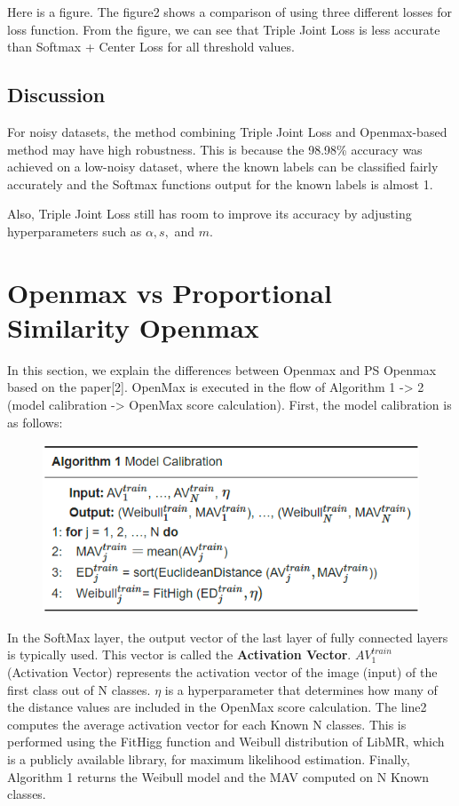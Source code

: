 \documentclass[dvipdfmx]{article}
\begin{document}
Here is a figure. The figure2 shows a comparison of using three different losses for loss function.
From the figure, we can see that Triple Joint Loss is less accurate than Softmax + Center Loss for all threshold values.

\subsection{Discussion}
For noisy datasets, the method combining Triple Joint Loss and Openmax-based method may have high robustness. This is because the 98.98\% accuracy was achieved on a low-noisy dataset, where the known labels can be classified fairly accurately and the Softmax functions output for the known labels is almost 1.

Also, Triple Joint Loss still has room to improve its accuracy by adjusting hyperparameters such as $\alpha, s,$ and $m$.

\section{Openmax vs Proportional Similarity Openmax}
In this section, we explain the differences between Openmax and PS Openmax based on the paper[2]. OpenMax is executed in the flow of Algorithm 1 -> 2 (model calibration -> OpenMax score calculation).
First, the model calibration is as follows:
\begin{figure}[H]
\begin{center}
\includegraphics[width=0.8\linewidth]{./img/openmax1_algo.png}
\end{center}
\end{figure}

In the SoftMax layer, the output vector of the last layer of fully connected layers is typically used. This vector is called the \textbf{Activation Vector}. $AV_1^{train}$ (Activation Vector) represents the activation vector of the image (input) of the first class out of N classes. $\eta$ is a hyperparameter that determines how many of the distance values are included in the OpenMax score calculation. The line2 computes the average activation vector for each Known N classes.
This is performed using the FitHigg function and Weibull distribution of LibMR, which is a publicly available library, for maximum likelihood estimation.
Finally, Algorithm 1 returns the Weibull model and the MAV computed on N Known classes.
\end{document}
